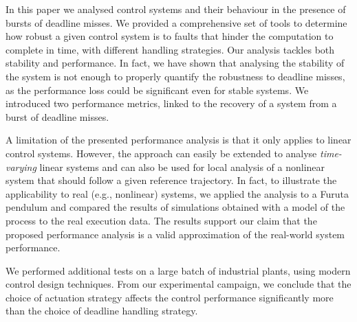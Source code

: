 In this paper we analysed control systems and their behaviour in the presence of bursts of deadline misses. 
We provided a comprehensive set of tools to determine how robust a given control system is to faults that hinder the computation to complete in time, with different handling strategies. 
%
Our analysis tackles both stability and performance. In fact, we have shown that analysing the stability of the system is not enough to properly quantify the robustness to deadline misses, as the performance loss could be significant even for stable systems. We introduced two performance metrics, linked to the recovery of a system from a burst of deadline misses.

A limitation of the presented performance analysis is that it only applies to linear control systems. However, the approach can easily be extended to analyse \emph{time-varying} linear systems and can also be used for local analysis of a nonlinear system that should follow a given reference trajectory. In fact, to illustrate the applicability to real (e.g., nonlinear) systems, we applied the  analysis to a Furuta pendulum and compared the results of simulations obtained with a model of the process to the real execution data.
The results support our claim that the proposed performance analysis is a valid approximation of the real-world system performance.

We performed additional tests on a large batch of industrial plants, using modern control design techniques. 
From our experimental campaign, we conclude that the choice of actuation strategy affects the control performance significantly more than the choice of deadline handling strategy.